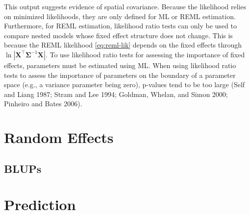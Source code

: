 \documentclass{article}
\begin{document}
This output suggests evidence of spatial covariance. Because the
likelihood relies on minimized likelihoods, they are only defined for ML
or REML estimation. Furthermore, for REML estimation, likelihood ratio
tests can only be used to compare nested models whose fixed effect
structure does not change. This is because the REML likelihood
\eqref{eq:reml-lik} depends on the fixed effects through
\(\ln{|\mathbf{X}^\intercal \mathbf{\Sigma}^{-1} \mathbf{X}|}\). To use
likelihood ratio tests for assessing the importance of fixed effects,
parameters must be estimated using ML. When using likelihood ratio tests
to assess the importance of parameters on the boundary of a parameter
space (e.g., a variance parameter being zero), p-values tend to be too
large (Self and Liang 1987; Stram and Lee 1994; Goldman, Whelan, and
Simon 2000; Pinheiro and Bates 2006).

\hypertarget{random-effects}{%
\section{Random Effects}\label{random-effects}}

\hypertarget{blups}{%
\subsection{BLUPs}\label{blups}}

\hypertarget{prediction}{%
\section{Prediction}\label{prediction}}
\end{document}
